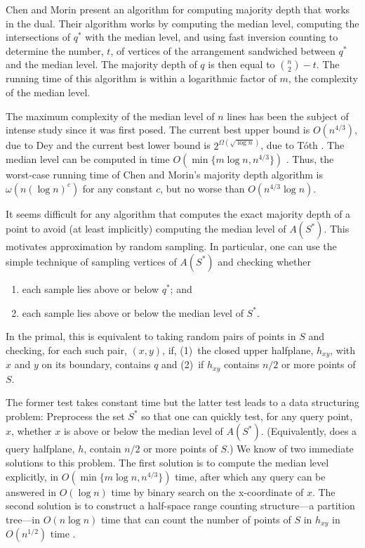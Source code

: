 \documentclass{cccg12}
\begin{document}
Chen and Morin \cite{cm11} present an algorithm for computing majority
depth that works in the dual.  Their algorithm works by computing the
median level, computing the intersections of $q^*$ with the median
level, and using fast inversion counting to determine the number, $t$,
of vertices of the arrangement sandwiched between $q^*$ and the median
level.  The majority depth of $q$ is then equal to $\binom{n}{2}-t$.
The running time of this algorithm is within a logarithmic factor of $m$,
the complexity of the median level.

The maximum complexity of the median level of $n$ lines has been the
subject of intense study since it was first posed.  The current best
upper bound is $O(n^{4/3})$, due to Dey \cite{d98} and the current best
lower bound is $2^{\Omega(\sqrt{\log n})}$, due to T\'oth \cite{t00}.
The median level can be computed in time $O(\min\{m\log n,n^{4/3}\})$
\cite{bj02,c99}.  Thus, the worst-case running time of Chen and Morin's
majority depth algorithm is $\omega(n(\log n)^c)$ for any constant $c$,
but no worse than $O(n^{4/3}\log n)$.

It seems difficult for any algorithm that computes the exact majority
depth of a point to avoid (at least implicitly) computing the median
level of $A(S^*)$.  This motivates approximation by random sampling.
In particular, one can use the simple technique of sampling vertices of
$A(S^*)$ and checking whether
\begin{enumerate}
  \item each sample lies above or below $q^*$; and
  \item each sample lies above or below the median level of $S^*$.
\end{enumerate}
In the primal, this is equivalent to taking random pairs of points in
$S$ and checking, for each such pair, $(x,y)$, if, (1)~the closed
upper halfplane, $h_{xy}$, with $x$ and $y$ on its boundary, contains $q$
and (2)~if $h_{xy}$ contains
 $n/2$ or more points of $S$.

The former test takes constant time but the latter test leads to a
data structuring problem:  Preprocess the set $S^*$ so that one can
quickly test, for any query point, $x$, whether $x$ is above or below
the median level of $A(S^*)$.  (Equivalently, does a query halfplane, $h$,
contain $n/2$ or more points of $S$.)  We know of two immediate solutions
to this problem.  The first solution is to compute the median level
explicitly, in $O(\min\{m\log n,n^{4/3}\})$ time, after which any query
can be answered in $O(\log n)$ time by binary search on the x-coordinate
of $x$.  The second solution is to construct a half-space range counting
structure---a partition tree---in $O(n\log n)$ time that can count the
number of points of $S$ in $h_{xy}$ in $O(n^{1/2})$ time \cite{c12}.
\end{document}
